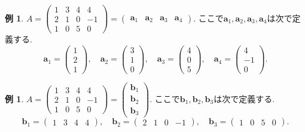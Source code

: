 \documentclass[dvipdfmx,a4paper,11pt]{article} %
\theoremstyle{definition}
\newtheorem{exa}[thm]{例}
\begin{document}
\begin{exa}
$
A=
  \begin{pmatrix}
 1 &3&4&4 \\
 2&1&0&-1\\
 1&0&5&0
 \end{pmatrix}
 = 
   \begin{pmatrix}
\bm{a}_1&\bm{a}_2&\bm{a}_3&\bm{a}_4
 \end{pmatrix}
$.
ここで$\bm{a}_1, \bm{a}_2, \bm{a}_3, \bm{a}_4$は次で定義する. 
$$
\bm{a}_1 = 
  \begin{pmatrix}
 1 \\2 \\1
 \end{pmatrix},\quad
 \bm{a}_2 = 
  \begin{pmatrix}
 3 \\1 \\0
 \end{pmatrix},\quad
  \bm{a}_3 = 
  \begin{pmatrix}
 4 \\0 \\5
 \end{pmatrix},\quad
  \bm{a}_4 = 
  \begin{pmatrix}
 4 \\-1 \\0
 \end{pmatrix}.
$$
\end{exa}
\begin{exa}
$
A=
  \begin{pmatrix}
 1 &3&4&4 \\
 2&1&0&-1\\
 1&0&5&0
 \end{pmatrix}
 = 
   \begin{pmatrix}
\bm{b}_1\\ \bm{b}_2\\ \bm{b}_3
 \end{pmatrix}
$.
ここで$\bm{b}_1, \bm{b}_2, \bm{b}_3$は次で定義する. 
$$
\bm{b}_1 = 
  \begin{pmatrix}
 1 &3 &4&4
 \end{pmatrix},\quad
\bm{b}_2= 
  \begin{pmatrix}
 2&1 &0&-1
 \end{pmatrix},\quad
 \bm{b}_3 = 
  \begin{pmatrix}
 1 &0 &5&0
 \end{pmatrix}.
 $$
\end{exa}
\end{document}
